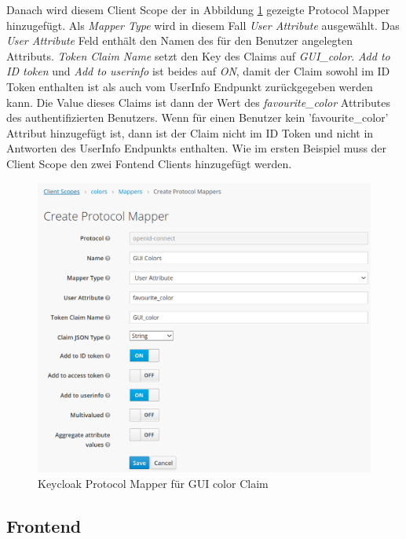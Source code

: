 Danach wird diesem Client Scope der in Abbildung \ref{fig:EB_Keycloak Protocol Mapper fuer GUI color Claim} gezeigte Protocol Mapper hinzugefügt. Als \textit{Mapper Type} wird in diesem Fall \textit{User Attribute} ausgewählt. Das \textit{User Attribute} Feld enthält den Namen des für den Benutzer angelegten Attributs. \textit{Token Claim Name} setzt den Key des Claims auf \textit{GUI\_color}. \textit{Add to ID token} und \textit{Add to userinfo} ist beides auf \textit{ON}, damit der Claim sowohl im ID Token enthalten ist als auch vom UserInfo Endpunkt zurückgegeben werden kann. Die Value dieses Claims ist dann der Wert des \textit{favourite\_color} Attributes des authentifizierten Benutzers. Wenn für einen Benutzer kein 'favourite\_color' Attribut hinzugefügt ist, dann ist der Claim nicht im ID Token und nicht in Antworten des UserInfo Endpunkts enthalten. Wie im ersten Beispiel muss der Client Scope den zwei Fontend Clients hinzugefügt werden.

\begin{figure}[!h]
	\centering
	\includegraphics[width=1\textwidth]{Images/Ebert/KeycloakNewClaimProtocolMapper.PNG}
	\caption{Keycloak Protocol Mapper für GUI color Claim}
	\label{fig:EB_Keycloak Protocol Mapper fuer GUI color Claim}
\end{figure}



\subsection{Frontend}

